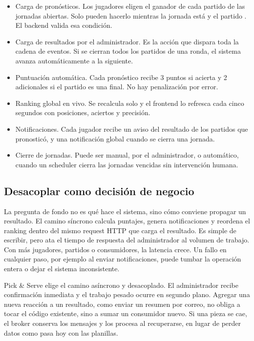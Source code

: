 \begin{itemize}
\item Carga de pronósticos. Los jugadores eligen el ganador de cada partido de las jornadas abiertas. Solo pueden hacerlo mientras la jornada está  y el partido . El backend valida esa condición.
\item Carga de resultados por el administrador. Es la acción que dispara toda la cadena de eventos. Si se cierran todos los partidos de una ronda, el sistema avanza automáticamente a la siguiente.
\item Puntuación automática. Cada pronóstico recibe 3 puntos si acierta y 2 adicionales si el partido es una final. No hay penalización por error.
\item Ranking global en vivo. Se recalcula solo y el frontend lo refresca cada cinco segundos con posiciones, aciertos y precisión.
\item Notificaciones. Cada jugador recibe un aviso del resultado de los partidos que pronosticó, y una notificación global cuando se cierra una jornada.
\item Cierre de jornadas. Puede ser manual, por el administrador, o automático, cuando un scheduler cierra las jornadas vencidas sin intervención humana.
\end{itemize}

\subsection{Desacoplar como decisión de negocio}

La pregunta de fondo no es qué hace el sistema, sino cómo conviene propagar un resultado. El camino síncrono calcula puntajes, genera notificaciones y reordena el ranking dentro del mismo request HTTP que carga el resultado. Es simple de escribir, pero ata el tiempo de respuesta del administrador al volumen de trabajo. Con más jugadores, partidos o consumidores, la latencia crece. Un fallo en cualquier paso, por ejemplo al enviar notificaciones, puede tumbar la operación entera o dejar el sistema inconsistente.

Pick \& Serve elige el camino asíncrono y desacoplado. El administrador recibe confirmación inmediata y el trabajo pesado ocurre en segundo plano. Agregar una nueva reacción a un resultado, como enviar un resumen por correo, no obliga a tocar el código existente, sino a sumar un consumidor nuevo. Si una pieza se cae, el broker conserva los mensajes y los procesa al recuperarse, en lugar de perder datos como pasa hoy con las planillas.

